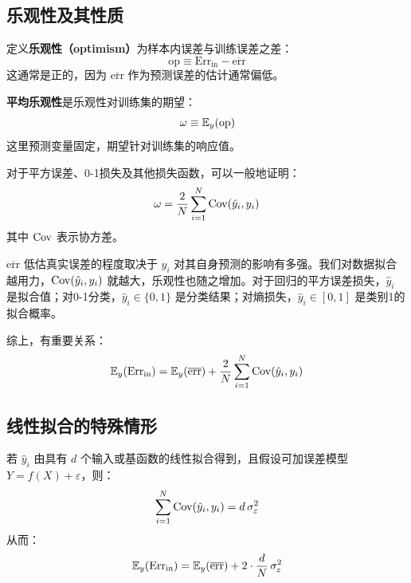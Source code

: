 \subsection{乐观性及其性质}

定义\textbf{乐观性（optimism）}为样本内误差与训练误差之差：
\begin{equation}\label{eq:op}
    \mathrm{op} \equiv \mathrm{Err}_{\text{in}} - \overline{\mathrm{err}}
\end{equation}
这通常是正的，因为 $\overline{\mathrm{err}}$ 作为预测误差的估计通常偏低。

\textbf{平均乐观性}是乐观性对训练集的期望：
\begin{equation}\label{eq:omega}
    \omega \equiv \mathbb{E}_y(\mathrm{op})
\end{equation}
这里预测变量固定，期望针对训练集的响应值。

对于平方误差、0-1损失及其他损失函数，可以一般地证明：
\begin{equation}\label{eq:omega_cov}
    \omega = \frac{2}{N}\sum_{i=1}^{N} \mathrm{Cov}(\hat{y}_i, y_i)
\end{equation}
其中 $\mathrm{Cov}$ 表示协方差。

\begin{remark}
    $\overline{\mathrm{err}}$ 低估真实误差的程度取决于 $y_i$ 对其自身预测的影响有多强。我们对数据拟合越用力，$\mathrm{Cov}(\hat{y}_i, y_i)$ 就越大，乐观性也随之增加。对于回归的平方误差损失，$\hat{y}_i$ 是拟合值；对0-1分类，$\hat{y}_i \in \{0,1\}$ 是分类结果；对熵损失，$\hat{y}_i \in [0,1]$ 是类别1的拟合概率。
\end{remark}

综上，有重要关系：
\begin{equation}\label{eq:Err_in_decomp}
    \mathbb{E}_y(\mathrm{Err}_{\text{in}}) = \mathbb{E}_y(\overline{\mathrm{err}}) + \frac{2}{N}\sum_{i=1}^{N} \mathrm{Cov}(\hat{y}_i, y_i)
\end{equation}

\subsection{线性拟合的特殊情形}

若 $\hat{y}_i$ 由具有 $d$ 个输入或基函数的线性拟合得到，且假设可加误差模型 $Y = f(X) + \varepsilon$，则：
\begin{equation}\label{eq:cov_linear}
    \sum_{i=1}^{N} \mathrm{Cov}(\hat{y}_i, y_i) = d\,\sigma_\varepsilon^2
\end{equation}
从而：
\begin{equation}\label{eq:Cp_motivation}
    \mathbb{E}_y(\mathrm{Err}_{\text{in}}) = \mathbb{E}_y(\overline{\mathrm{err}}) + 2\cdot\frac{d}{N}\,\sigma_\varepsilon^2
\end{equation}

